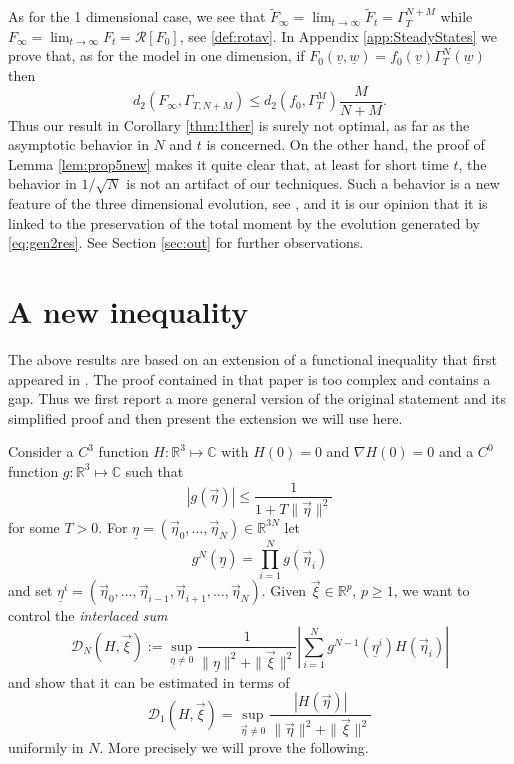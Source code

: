 \documentclass{article}
\newcommand \ul[1]{\underline{#1}}
\renewcommand\v[1]{\vec{#1}}
\newcommand*\R{ \mathds{R} }
\newcommand\uv{{\underline v}}
\newcommand\uw{{\underline w}}
\newcommand\vxi{{\vec \xi}}
\begin{document}
As for the 1 dimensional case, we see that $\widetilde F_\infty=\lim_{t\to\infty}\widetilde F_t=\Gamma_T^{N+M}$ while
$F_\infty=\lim_{t\to\infty}F_t=\mathcal R[F_0]$, see \eqref{def:rotav}.
In Appendix \ref{app:SteadyStates} we prove that, as for the model in one dimension, if
$F_0(\uv,\uw)=f_0(\uv)\Gamma^N_T(\uw)$ then
\[
d_2(F_\infty,\Gamma_{T,N+M})\leq d_2(f_0,\Gamma_T^M)\frac{M}{N+M}.
\]
Thus our result in Corollary \ref{thm:1ther} is surely not optimal, as far as the asymptotic behavior in $N$ and $t$ is
concerned. On the other hand, the proof of Lemma \ref{lem:prop5new} makes it quite clear that, at least for short time
$t$, the behavior in $1/\sqrt N$ is not an artifact of our techniques. Such a behavior is a new feature of the three
dimensional evolution, see \cite{BLTV}, and it is our opinion that it is linked to the preservation of the
total moment by the evolution generated by \eqref{eq:gen2res}. See Section \ref{sec:out} for further observations.
 


\section{A new inequality}\label{newinequ}

The above results are based on an extension of a functional inequality that first appeared in \cite{BLTV}.  The proof
contained in that paper is too complex and contains a gap. Thus we first report a more general version of the original
statement and its simplified proof and then present the extension we will use here. 
 
Consider a $C^3$ function  $H:\mathds R^3\mapsto\mathds C$ with $H(0)=0$ and $\nabla H(0)=0$ and a $C^0$ function 
$g:\mathds R^3\mapsto\mathds C$ such that 
\[
|g(\v\eta)|\leq \frac 1{1+T \|\v \eta\|^2}
\]
for some $T>0$.
For $\ul \eta=(\v \eta_0,\ldots,\v \eta_N)\in\mathds R^{3N}$ let
\[
g^{N}(\ul \eta)=\prod_{i=1}^N g(\v \eta_i)
\] 
and set $\ul \eta^i=(\v\eta_0,\ldots,\v\eta_{i-1},\v\eta_{i+1},\ldots, \v\eta_N)$. Given $\v\xi\in\R^p$, $p\geq1$, we 
want to 
control the {\it interlaced sum}
\begin{equation}\label{eq:DN}
\mathcal D_N(H,\v\xi):=\sup_{\ul \eta\not=0}\frac{1}{\|\ul \eta\|^2+\|\v\xi\|^2}
\left|\sum_{i=1}^N g^{ N - 1}(\ul \eta^i)H(\v\eta_i)\right|
\end{equation}
and show that it can be estimated in terms of %
\[
\mathcal D_1(H,\v\xi)=\sup_{\v \eta\not=0}\frac{\left|H(\v\eta)\right|}{\|\v \eta\|^2+\|\v\xi\|^2}
\]
uniformly in $N$.
More precisely we will prove the following.
\end{document}
